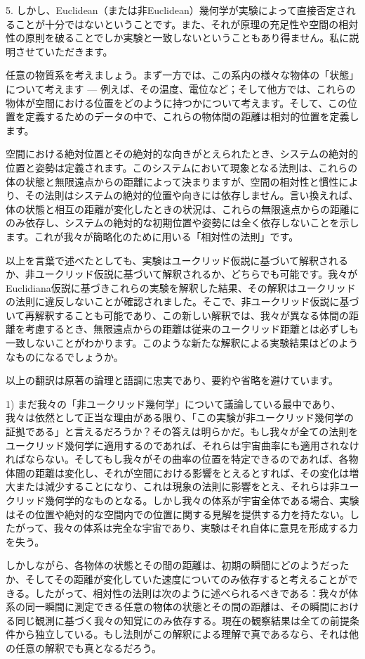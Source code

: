 \documentclass[a4paper,11pt,openany]{ltjsbook}
\begin{document}
5. しかし、Euclidean（または非Euclidean）幾何学が実験によって直接否定されることが十分ではないということです。また、それが原理の充足性や空間の相対性の原則を破ることでしか実験と一致しないということもあり得ません。私に説明させていただきます。

任意の物質系を考えましょう。まず一方では、この系内の様々な物体の「状態」について考えます — 例えば、その温度、電位など；そして他方では、これらの物体が空間における位置をどのように持つかについて考えます。そして、この位置を定義するためのデータの中で、これらの物体間の距離は相対的位置を定義します。

空間における絶対位置とその絶対的な向きがとえられたとき、システムの絶対的位置と姿勢は定義されます。このシステムにおいて現象となる法則は、これらの体の状態と無限遠点からの距離によって決まりますが、空間の相対性と慣性により、その法則はシステムの絶対的位置や向きには依存しません。言い換えれば、体の状態と相互の距離が変化したときの状況は、これらの無限遠点からの距離にのみ依存し、システムの絶対的な初期位置や姿勢には全く依存しないことを示します。これが我々が簡略化のために用いる「相対性の法則」です。

以上を言葉で述べたとしても、実験はユークリッド仮説に基づいて解釈されるか、非ユークリッド仮説に基づいて解釈されるか、どちらでも可能です。我々がEuclidiana仮説に基づきこれらの実験を解釈した結果、その解釈はユークリッドの法則に違反しないことが確認されました。そこで、非ユークリッド仮説に基づいて再解釈することも可能であり、この新しい解釈では、我々が異なる体間の距離を考慮するとき、無限遠点からの距離は従来のユークリッド距離とは必ずしも一致しないことがわかります。このような新たな解釈による実験結果はどのようなものになるでしょうか。

以上の翻訳は原著の論理と語調に忠実であり、要約や省略を避けています。

1) まだ我々の「非ユークリッド幾何学」について議論している最中であり、我々は依然として正当な理由がある限り、「この実験が非ユークリッド幾何学の証拠である」と言えるだろうか？その答えは明らかだ。もし我々が全ての法則をユークリッド幾何学に適用するのであれば、それらは宇宙曲率にも適用されなければならない。そしてもし我々がその曲率の位置を特定できるのであれば、各物体間の距離は変化し、それが空間における影響をとえるとすれば、その変化は増大または減少することになり、これは現象の法則に影響をとえ、それらは非ユークリッド幾何学的なものとなる。しかし我々の体系が宇宙全体である場合、実験はその位置や絶対的な空間内での位置に関する見解を提供する力を持たない。したがって、我々の体系は完全な宇宙であり、実験はそれ自体に意見を形成する力を失う。

しかしながら、各物体の状態とその間の距離は、初期の瞬間にどのようだったか、そしてその距離が変化していた速度についてのみ依存すると考えることができる。したがって、相対性の法則は次のように述べられるべきである：我々が体系の同一瞬間に測定できる任意の物体の状態とその間の距離は、その瞬間における同じ観測に基づく我々の知覚にのみ依存する。現在の観察結果は全ての前提条件から独立している。もし法則がこの解釈による理解で真であるなら、それは他の任意の解釈でも真となるだろう。
\end{document}
